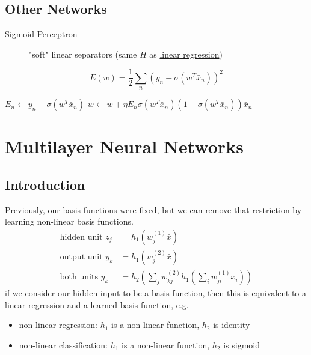 \documentclass[]{article}
\theoremstyle{definition}
\begin{document}
    \subsection{Other Networks}
    \label{sub:other_networks}
    \begin{description}
        \item[Sigmoid Perceptron] "soft" linear separators (same $H$ as \hyperref[sec:logistic_regression]{linear regression})
    \end{description}
    \begin{equation*}
        E(w) = \frac{1}{2} \sum_n (y_n - \sigma (w^T \bar x_n))^2
    \end{equation*}
    \begin{algorithmic}
        \State $E_n \leftarrow y_n - \sigma (w^T \bar x_n)$
        \State $w \leftarrow w + \eta E_n \sigma (w^T \bar x_n)(1 - \sigma (w^T \bar x_n)) \bar x_n$
        \EndFor
    \end{algorithmic} 

    \section{Multilayer Neural Networks}
    \label{sec:multilayer_neural_networks}

    \subsection{Introduction}
    Previously, our basis functions were fixed, but we can remove that restriction by learning non-linear basis functions.
    \begin{align*}
        \label{eq:}
        \text{hidden unit } z_j &= h_1 (w_j^{(1)} \bar x) \\
        \text{output unit } y_k &= h_1 (w_j^{(2)} \bar x)  \\
        \text{both units } y_k &= h_2(\sum_j w_{kj}^{(2)} h_1 (\sum_i w_{ji}^{(1)} x_i))
    \end{align*}
    if we consider our hidden input to be a basis function, then this is equivalent to a linear regression and a learned basis function, e.g.
    \begin{itemize}
        \item non-linear regression: $h_1$ is a non-linear function, $h_2$ is identity
        \item non-linear classification: $h_1$ is a non-linear function, $h_2$ is sigmoid
    \end{itemize}
\end{document}
